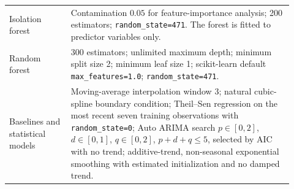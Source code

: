 \begin{table}[H]
\begin{tabular}{p{0.20\linewidth}p{0.72\linewidth}}
		Isolation forest                 & Contamination \(0.05\) for feature-importance analysis; 200 estimators; \texttt{random\_state=471}. The forest is fitted to predictor variables only.                                                                                                                                                                                                                                                                                                     \\
		Random forest                    & 300 estimators; unlimited maximum depth; minimum split size 2; minimum leaf size 1; scikit-learn default \texttt{max\_features=1.0}; \texttt{random\_state=471}.                                                                                                                                                                                                                                                                                         \\
		Baselines and statistical models & Moving-average interpolation window 3; natural cubic-spline boundary condition; Theil--Sen regression on the most recent seven training observations with \texttt{random\_state=0}; Auto ARIMA search \(p\in[0,2]\), \(d\in[0,1]\), \(q\in[0,2]\), \(p+d+q\leq5\), selected by AIC with no trend; additive-trend, non-seasonal exponential smoothing with estimated initialization and no damped trend.                                                  \\
		\bottomrule
	\end{tabular}
	\label{tab:model-configurations}
\end{table}
